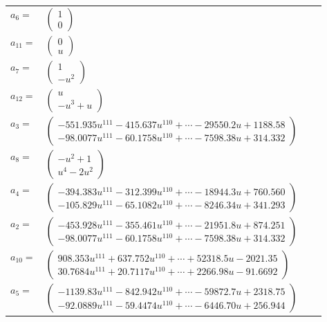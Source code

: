 \documentclass[1p]{elsarticle_modified}
\theoremstyle{definition}
\begin{document}
\begin{tabular}{m{7pt} m{180pt} m{7pt} m{180pt} }
\flushright $a_{6}=$&$\begin{pmatrix}1\\0\end{pmatrix}$ \\
\flushright $a_{11}=$&$\begin{pmatrix}0\\u\end{pmatrix}$ \\
\flushright $a_{7}=$&$\begin{pmatrix}1\\- u^2\end{pmatrix}$ \\
\flushright $a_{12}=$&$\begin{pmatrix}u\\- u^3+u\end{pmatrix}$ \\
\flushright $a_{3}=$&$\begin{pmatrix}-551.935 u^{111}-415.637 u^{110}+\cdots-29550.2 u+1188.58\\-98.0077 u^{111}-60.1758 u^{110}+\cdots-7598.38 u+314.332\end{pmatrix}$ \\
\flushright $a_{8}=$&$\begin{pmatrix}- u^2+1\\u^4-2 u^2\end{pmatrix}$ \\
\flushright $a_{4}=$&$\begin{pmatrix}-394.383 u^{111}-312.399 u^{110}+\cdots-18944.3 u+760.560\\-105.829 u^{111}-65.1082 u^{110}+\cdots-8246.34 u+341.293\end{pmatrix}$ \\
\flushright $a_{2}=$&$\begin{pmatrix}-453.928 u^{111}-355.461 u^{110}+\cdots-21951.8 u+874.251\\-98.0077 u^{111}-60.1758 u^{110}+\cdots-7598.38 u+314.332\end{pmatrix}$ \\
\flushright $a_{10}=$&$\begin{pmatrix}908.353 u^{111}+637.752 u^{110}+\cdots+52318.5 u-2021.35\\30.7684 u^{111}+20.7117 u^{110}+\cdots+2266.98 u-91.6692\end{pmatrix}$ \\
\flushright $a_{5}=$&$\begin{pmatrix}-1139.83 u^{111}-842.942 u^{110}+\cdots-59872.7 u+2318.75\\-92.0889 u^{111}-59.4474 u^{110}+\cdots-6446.70 u+256.944\end{pmatrix}$ \\

\end{tabular}
\end{document}
